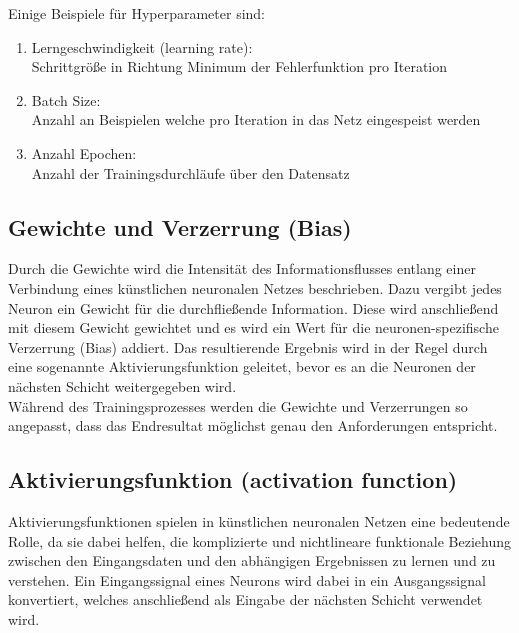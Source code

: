 Einige Beispiele für Hyperparameter sind:

\begin{enumerate}
	\item Lerngeschwindigkeit (learning rate):\\
	Schrittgröße in Richtung Minimum der Fehlerfunktion pro Iteration 
	\item Batch Size:\\
	Anzahl an Beispielen welche pro Iteration in das Netz eingespeist werden
	\item Anzahl Epochen:\\
	Anzahl der Trainingsdurchläufe über den Datensatz
\end{enumerate}
	
\subsection{Gewichte und Verzerrung (Bias)}

	Durch die Gewichte wird die Intensität des Informationsflusses entlang einer Verbindung eines künstlichen neuronalen Netzes beschrieben. Dazu vergibt jedes Neuron ein Gewicht für die durchfließende Information. Diese wird anschließend mit diesem Gewicht gewichtet und es wird ein Wert für die neuronen-spezifische Verzerrung (Bias) addiert. Das resultierende Ergebnis wird in der Regel durch eine sogenannte Aktivierungsfunktion geleitet, bevor es an die Neuronen der nächsten Schicht weitergegeben wird. \cite{jaai} \\
	
	Während des Trainingsprozesses werden die Gewichte und Verzerrungen so angepasst, dass das Endresultat möglichst genau den Anforderungen entspricht. \cite{jaai}
	
\subsection{Aktivierungsfunktion (activation function)}

	Aktivierungsfunktionen spielen in künstlichen neuronalen Netzen eine bedeutende Rolle, da sie dabei helfen, die komplizierte und nichtlineare funktionale Beziehung zwischen den Eingangsdaten und den abhängigen Ergebnissen zu lernen und zu verstehen. Ein Eingangssignal eines Neurons wird dabei in ein Ausgangssignal konvertiert, welches anschließend als Eingabe der nächsten Schicht verwendet wird. \cite{ai-united} \\
	
